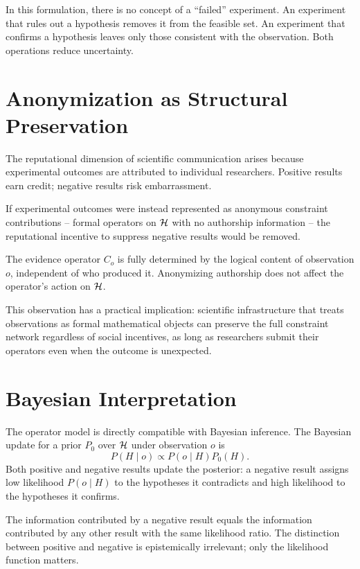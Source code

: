 In this formulation, there is no concept of a ``failed'' experiment. An experiment that rules out a hypothesis removes it from the feasible set. An experiment that confirms a hypothesis leaves only those consistent with the observation. Both operations reduce uncertainty.

\section{Anonymization as Structural Preservation}

The reputational dimension of scientific communication arises because experimental outcomes are attributed to individual researchers. Positive results earn credit; negative results risk embarrassment.

If experimental outcomes were instead represented as anonymous constraint contributions -- formal operators on $\mathcal{H}$ with no authorship information -- the reputational incentive to suppress negative results would be removed.

\begin{proposition}
The evidence operator $C_o$ is fully determined by the logical content of observation $o$, independent of who produced it. Anonymizing authorship does not affect the operator's action on $\mathcal{H}$.
\end{proposition}

This observation has a practical implication: scientific infrastructure that treats observations as formal mathematical objects can preserve the full constraint network regardless of social incentives, as long as researchers submit their operators even when the outcome is unexpected.

\section{Bayesian Interpretation}

The operator model is directly compatible with Bayesian inference. The Bayesian update for a prior $P_0$ over $\mathcal{H}$ under observation $o$ is
\[
P(H \mid o) \propto P(o \mid H) P_0(H).
\]
Both positive and negative results update the posterior: a negative result assigns low likelihood $P(o \mid H)$ to the hypotheses it contradicts and high likelihood to the hypotheses it confirms.

\begin{proposition}
The information contributed by a negative result equals the information contributed by any other result with the same likelihood ratio. The distinction between positive and negative is epistemically irrelevant; only the likelihood function matters.
\end{proposition}

